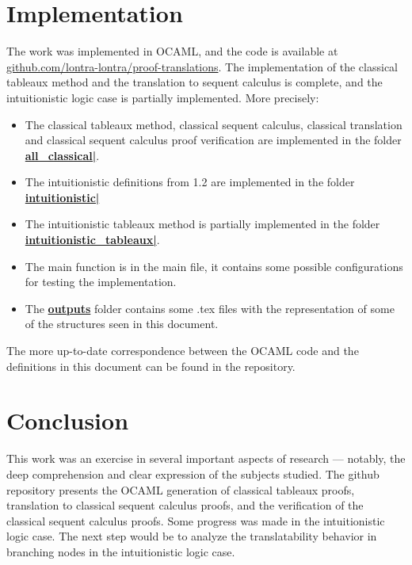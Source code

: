 \documentclass[runningheads]{llncs}
\begin{document}
\section{Implementation}
    The work was implemented in OCAML, and the code is available at \url{github.com/lontra-lontra/proof-translations}.
    The implementation of the classical tableaux method and the translation to sequent calculus is complete, and the intuitionistic logic case is partially implemented.
    More precisely:
    \begin{itemize}
        \item The classical tableaux method, classical sequent calculus, classical translation and classical sequent calculus proof verification are implemented in the folder \textbf{\href {https://github.com/lontra-lontra/proof-translations/tree/main/PROJECT/all_classical }{all\_classical|}}. 
        \item The intuitionistic definitions from 1.2 are implemented in the folder \textbf{\href {https://github.com/lontra-lontra/proof-translations/tree/main/PROJECT/intuitionistic }{intuitionistic|}}
        \item The intuitionistic tableaux method is partially implemented in the folder \textbf{\href {https://github.com/lontra-lontra/proof-translations/tree/main/PROJECT/intuitionistic_tableaux }{intuitionistic\_tableaux|}}.
        \item The main function is in the main file, it contains some possible configurations for testing the implementation.
        \item The \textbf{\href {https://github.com/lontra-lontra/proof-translations/tree/main/PROJECT/outputs }{outputs}} folder contains some .tex files with the representation of some of the structures seen in this document.    \end{itemize}
    The more up-to-date correspondence between the OCAML code and the definitions in this document can be found in the repository.
%
%
%
% 
% 
%
\section{ Conclusion}
    This work was an exercise in several important aspects of research — notably,
     the deep comprehension and clear expression of the subjects studied. The github repository presents the 
      OCAML generation of classical tableaux proofs, translation to classical sequent calculus proofs, and the verification of the classical sequent calculus proofs. Some
     progress was made in the intuitionistic logic case.
     The next step would be to analyze the translatability behavior in branching nodes in the intuitionistic logic case.
\end{document}
